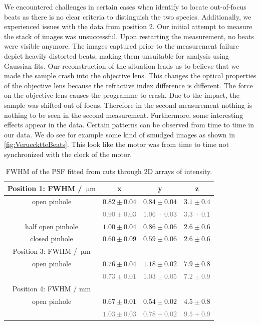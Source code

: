 We encountered challenges in certain cases when identify to locate out-of-focus beats as there is no clear criteria to distinguish the two species.
Additionally, we experienced issues with the data from position 2. Our initial attempt to measure the stack of images was unsuccessful. 
Upon restarting the measurement, no beats were visible anymore. The images captured prior to the measurement failure depict heavily distorted beats, making them unsuitable for analysis using Gaussian fits.
Our reconstruction of the situation leads us to believe that we made the sample crash into the objective lens. This changes the optical properties of the objective lens because 
the refractive index difference is different. The force on the objective lens causes the programme to crash. Due to the impact, the sample was shifted out of focus. Therefore in the second measurement nothing 
is nothing to be seen in the second measurement.
Furthermore, some interesting effects appear in the data. Certain patterns can be observed from time to time in our data. We do see for example 
some kind of smudged images as shown in \cref{fig:VeruecktteBeats}. This look like the motor was from time to time not synchronized with the clock of the motor. 

\begin{table}[ht]
    \centering
    \begin{tabular}{cccc}
        \toprule Position 1: FWHM / $\SI{}{\micro \meter}$ & \textbf{x} &\textbf{y} & \textbf{z} \\
        \hline\hline open pinhole & $0.82\pm0.04$ & $0.84\pm0.04$ &  $3.1\pm0.4$ \\
        & \textcolor{gray}{$0.90\pm0.03$} & \textcolor{gray}{$1.06+0.03$} & \textcolor{gray}{$3.3+0.1$}\\
        half open pinhole & $1.00 \pm0.04$ &$ 0.86\pm0.06 $& $2.6\pm0.6$ \\
        closed pinhole & $0.60 \pm 0.09$ & $0.59 \pm 0.06$ & $2.6\pm0.6$ \\
        \hline Position 3: FWHM / $\SI{}{\micro \meter}$  & & &  \\
        \hline open pinhole & $0.76\pm0.04$ & $ 1.18\pm0.02$ & $7.9\pm0.8$ \\
        & \textcolor{gray}{$0.73\pm0.01$} & \textcolor{gray}{$1.03\pm0.05$} & \textcolor{gray}{$7.2\pm0.9$}\\
        \hline Position 4: FWHM / $\mathrm{mm}$  & & &  \\
        \hline open pinhole & $0.67\pm0.01$ & $0.54 \pm 0.02$ & $4.5\pm 0.8$ \\
        & \textcolor{gray}{$1.03\pm0.03$} & \textcolor{gray}{$0.78+0.02$} & \textcolor{gray}{$9.5+0.9$}\\
        \bottomrule
    \end{tabular}
    \caption{FWHM of the PSF fitted from cuts through 2D arrays of intensity. }
    \label{tab:FWHM}
\end{table}


